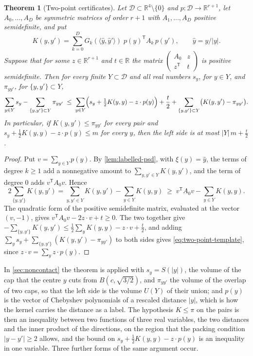 \documentclass[11pt,reqno]{amsart}
\renewcommand{\_}{\origunderscore\allowbreak}
\numberwithin{equation}{section}
\theoremstyle{plain}
\newtheorem{thm}{Theorem}[section]
\theoremstyle{definition}
\theoremstyle{remark}
\begin{document}
\begin{thm}[Two-point certificates]\label{thm:two-point-template}
Let $\mathcal D\subset\mathbb{R}^4\setminus\{0\}$ and
$p\colon\mathcal D\to\mathbb{R}^{r+1}$, let $A_0,\dots,A_D$ be symmetric
matrices of order $r+1$ with $A_1,\dots,A_D$ positive semidefinite, and
put
\[
  K(y,y')=\sum_{k=0}^DG_k(\langle\hat y,\hat y'\rangle)\;p(y)^{\mathsf T}A_k\,p(y'),
  \qquad\hat y=y/|y| .
\]
Suppose that for some $z\in\mathbb{R}^{r+1}$ and $t\in\mathbb{R}$ the
matrix $\begin{pmatrix}A_0&z\\ z^{\mathsf T}&t\end{pmatrix}$ is positive
semidefinite. Then for every finite $Y\subset\mathcal D$ and all real
numbers $s_y$, for $y\in Y$, and $\pi_{yy'}$, for $\{y,y'\}\subset Y$,
\begin{equation}\label{eq:two-point-template}
  \sum_{y\in Y}s_y-\sum_{\{y,y'\}\subset Y}\pi_{yy'}
  \;\le\;\sum_{y\in Y}\Bigl(s_y+\tfrac12K(y,y)-z\cdot p(y)\Bigr)+\frac t2
  +\sum_{\{y,y'\}\subset Y}\bigl(K(y,y')-\pi_{yy'}\bigr).
\end{equation}
In particular, if $K(y,y')\le\pi_{yy'}$ for every pair and
$s_y+\frac12K(y,y)-z\cdot p(y)\le m$ for every $y$, then the left side is
at most $|Y|\,m+\frac t2$.
\end{thm}

\begin{proof}
Put $v=\sum_{y\in Y}p(y)$. By \cref{lem:labelled-psd}, with
$\xi(y)=\hat y$, the terms of degree $k\ge1$ add a nonnegative amount to
$\sum_{y,y'\in Y}K(y,y')$, and the term of degree $0$ adds
$v^{\mathsf T}A_0v$. Hence
\[
  2\sum_{\{y,y'\}}K(y,y')=\sum_{y,y'\in Y}K(y,y')-\sum_{y\in Y}K(y,y)
  \;\ge\;v^{\mathsf T}A_0v-\sum_{y\in Y}K(y,y).
\]
The quadratic form of the positive semidefinite matrix, evaluated at the
vector $(v,-1)$, gives $v^{\mathsf T}A_0v-2z\cdot v+t\ge0$. The two
together give
$-\sum_{\{y,y'\}}K(y,y')\le\frac12\sum_yK(y,y)-z\cdot v+\frac t2$, and
adding $\sum_ys_y+\sum_{\{y,y'\}}(K(y,y')-\pi_{yy'})$ to both sides gives
\eqref{eq:two-point-template}, since $z\cdot v=\sum_yz\cdot p(y)$.
\end{proof}

In \cref{sec:noncontact} the theorem is applied with $s_y=S(|y|)$, the
volume of the cap that the centre $y$ cuts from $B(c,\sqrt{3/2})$, and
$\pi_{yy'}$ the volume of the overlap of two caps, so that the left side
is the volume $U(Y)$ of their union; and $p(y)$ is the vector of
Chebyshev polynomials of a rescaled distance $|y|$, which is how the
kernel carries the distance as a label. The hypothesis $K\le\pi$ on the
pairs is then an inequality between two functions of three real
variables, the two distances and the inner product of the directions, on
the region that the packing condition $|y-y'|\ge2$ allows, and the bound
on $s_y+\frac12K(y,y)-z\cdot p(y)$ is an inequality in one variable. Three
further forms of the same argument occur.
\end{document}
